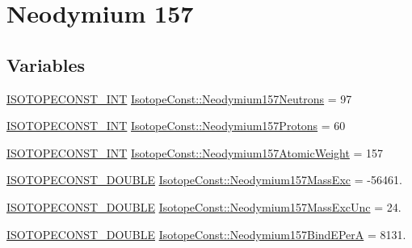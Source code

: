 \hypertarget{group___isotope_const-_neodymium-_nd157}{}\section{Neodymium 157}
\label{group___isotope_const-_neodymium-_nd157}
\subsection*{Variables}
\begin{DoxyCompactItemize}
\item 
\mbox{\hyperlink{group___isotope_const-_macros_ga5f18360b3e99483a35c32d789e62621c}{I\+S\+O\+T\+O\+P\+E\+C\+O\+N\+S\+T\+\_\+\+I\+NT}} \mbox{\hyperlink{group___isotope_const-_neodymium-_nd157_ga1dc4254db171c75556f56e673829192b}{Isotope\+Const\+::\+Neodymium157\+Neutrons}} = 97
\item 
\mbox{\hyperlink{group___isotope_const-_macros_ga5f18360b3e99483a35c32d789e62621c}{I\+S\+O\+T\+O\+P\+E\+C\+O\+N\+S\+T\+\_\+\+I\+NT}} \mbox{\hyperlink{group___isotope_const-_neodymium-_nd157_ga55eca161d0573940d09c4a945d98bce3}{Isotope\+Const\+::\+Neodymium157\+Protons}} = 60
\item 
\mbox{\hyperlink{group___isotope_const-_macros_ga5f18360b3e99483a35c32d789e62621c}{I\+S\+O\+T\+O\+P\+E\+C\+O\+N\+S\+T\+\_\+\+I\+NT}} \mbox{\hyperlink{group___isotope_const-_neodymium-_nd157_ga44f75b81e65b845333c6c7d0c778d8d0}{Isotope\+Const\+::\+Neodymium157\+Atomic\+Weight}} = 157
\item 
\mbox{\hyperlink{group___isotope_const-_macros_ga8f45a7272ce02c0b4c65c44636ed719a}{I\+S\+O\+T\+O\+P\+E\+C\+O\+N\+S\+T\+\_\+\+D\+O\+U\+B\+LE}} \mbox{\hyperlink{group___isotope_const-_neodymium-_nd157_ga9b858d930b772143a6ff89730420daa1}{Isotope\+Const\+::\+Neodymium157\+Mass\+Exc}} = -\/56461.
\item 
\mbox{\hyperlink{group___isotope_const-_macros_ga8f45a7272ce02c0b4c65c44636ed719a}{I\+S\+O\+T\+O\+P\+E\+C\+O\+N\+S\+T\+\_\+\+D\+O\+U\+B\+LE}} \mbox{\hyperlink{group___isotope_const-_neodymium-_nd157_ga92ba1661e6d8797e58d91b82ef360311}{Isotope\+Const\+::\+Neodymium157\+Mass\+Exc\+Unc}} = 24.
\item 
\mbox{\hyperlink{group___isotope_const-_macros_ga8f45a7272ce02c0b4c65c44636ed719a}{I\+S\+O\+T\+O\+P\+E\+C\+O\+N\+S\+T\+\_\+\+D\+O\+U\+B\+LE}} \mbox{\hyperlink{group___isotope_const-_neodymium-_nd157_ga02f278ab08ee9615c808c1805f786b8b}{Isotope\+Const\+::\+Neodymium157\+Bind\+E\+PerA}} = 8131.
\item 

\end{DoxyCompactItemize}
